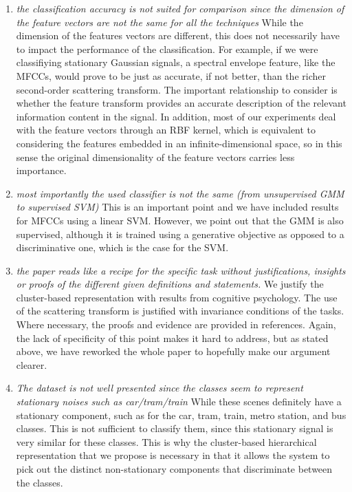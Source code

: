 \documentclass[10pt]{article}
\begin{document}
\begin{enumerate}
\item \emph{the classification accuracy is not suited for comparison since the dimension of the feature vectors are not the same for all the techniques }
While the dimension of the features vectors are different, this does not necessarily have to impact the performance of the classification. For example, if we were classifiying stationary Gaussian signals, a spectral envelope feature, like the MFCCs, would prove to be just as accurate, if not better, than the richer second-order scattering transform. The important relationship to consider is whether the feature transform provides an accurate description of the relevant information content in the signal. In addition, most of our experiments deal with the feature vectors through an RBF kernel, which is equivalent to considering the features embedded in an infinite-dimensional space, so in this sense the original dimensionality of the feature vectors carries less importance.

\item \emph{most importantly the used classifier is not the same (from unsupervised GMM to supervised SVM)}
This is an important point and we have included results for MFCCs using a linear SVM. However, we point out that the GMM is also supervised, although it is trained using a generative objective as opposed to a discriminative one, which is the case for the SVM.

\item \emph{the paper reads like a recipe for the specific task without justifications, insights or proofs of the different given definitions and statements.}
We justify the cluster-based representation with results from cognitive psychology. The use of the scattering transform is justified with invariance conditions of the tasks. Where necessary, the proofs and evidence are provided in references. Again, the lack of specificity of this point makes it hard to address, but as stated above, we have reworked the whole paper to hopefully make our argument clearer.

\item \emph{The dataset is not well presented since the classes seem to represent stationary noises such as car/tram/train}
While these scenes definitely have a stationary component, such as for the car, tram, train, metro station, and bus classes. This is not sufficient to classify them, since this stationary signal is very similar for these classes. This is why the cluster-based hierarchical representation that we propose is necessary in that it allows the system to pick out the distinct non-stationary components that discriminate between the classes.


\end{enumerate}
\end{document}
